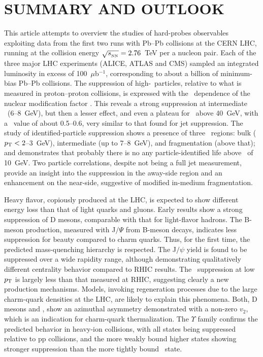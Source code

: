 \section{SUMMARY AND OUTLOOK}
\label{summary}
This article attempts to overview the studies of hard-probes observables exploiting data from the first two runs with Pb--Pb collisions at the CERN LHC, running at the collision energy $\sqrt{s_{_{\rm NN}}} = 2.76$~TeV per a nucleon pair. Each of the three major LHC experiments (ALICE, ATLAS and CMS) sampled an integrated luminosity in excess of 100~$\mu$b$^{-1}$, corresponding to about a billion of minimum-bias Pb--Pb collisions. The suppression of high-\pT\ particles, relative to what is measured in proton--proton collisions, is expressed with the \pt\ dependence of the nuclear modification factor \Raa. This reveals a strong suppression at intermediate \pT\ (6--8~GeV), but then a lesser effect, and even a plateau for \pt\ above 40~GeV, with a \Raa\ value of about 0.5--0.6, very similar to that found for jet suppression. The study of identified-particle suppression shows a presence of three \pt\ regions: bulk ($\mbox{$p_{\mathrm{T}}$} < 2$--$3$~GeV), intermediate (up to 7--8~GeV), and fragmentation (above that); and demonstrates that probably there is no any particle-identified life above \pt\ of 10~GeV. Two particle correlations, despite not being a full jet measurement, provide an insight into the suppression in the away-side region and an enhancement on the near-side,
suggestive of modified in-medium fragmentation.

Heavy flavor, copiously produced at the LHC, is expected to show different energy loss than that of
light quarks and gluons. Early results show a strong suppression of D mesons, comparable with that for light-flavor hadrons. The B-meson production, measured with J$/\Psi$ from B-meson decays, indicates less suppression for beauty compared to charm quarks. Thus, for the first time, the predicted mass-quenching hierarchy is respected. The J$/\psi$ yield is found to be suppressed over a wide rapidity range, although demonstrating qualitatively different centrality behavior compared to RHIC results. The \Jpsi\ suppression at low $\mbox{$p_{\mathrm{T}}$}$ is largely less than that measured at RHIC, suggesting clearly a new production mechanisms. Models, invoking regeneration processes due to the large charm-quark densities at the LHC, are likely to explain this phenomena. Both, D mesons and \Jpsi, show an azimuthal asymmetry demonstrated with a non-zero $v_2$, which is an indication for charm-quark thermalization. The $\Upsilon$ family confirms the predicted behavior in heavy-ion collisions, with all states being suppressed relative to pp collisions, and the more weakly bound higher states showing stronger suppression than the more tightly bound \PgUa\ state.

